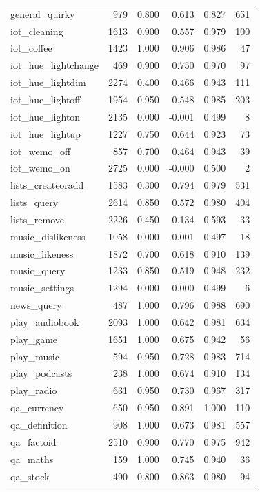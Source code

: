 \begin{longtable}{lrrrrr}
general\_quirky & 979 & 0.800 & 0.613 & 0.827 & 651 \\
iot\_cleaning & 1613 & 0.900 & 0.557 & 0.979 & 100 \\
iot\_coffee & 1423 & 1.000 & 0.906 & 0.986 & 47 \\
iot\_hue\_lightchange & 469 & 0.900 & 0.750 & 0.970 & 97 \\
iot\_hue\_lightdim & 2274 & 0.400 & 0.466 & 0.943 & 111 \\
iot\_hue\_lightoff & 1954 & 0.950 & 0.548 & 0.985 & 203 \\
iot\_hue\_lighton & 2135 & 0.000 & -0.001 & 0.499 & 8 \\
iot\_hue\_lightup & 1227 & 0.750 & 0.644 & 0.923 & 73 \\
iot\_wemo\_off & 857 & 0.700 & 0.464 & 0.943 & 39 \\
iot\_wemo\_on & 2725 & 0.000 & -0.000 & 0.500 & 2 \\
lists\_createoradd & 1583 & 0.300 & 0.794 & 0.979 & 531 \\
lists\_query & 2614 & 0.850 & 0.572 & 0.980 & 404 \\
lists\_remove & 2226 & 0.450 & 0.134 & 0.593 & 33 \\
music\_dislikeness & 1058 & 0.000 & -0.001 & 0.497 & 18 \\
music\_likeness & 1872 & 0.700 & 0.618 & 0.910 & 139 \\
music\_query & 1233 & 0.850 & 0.519 & 0.948 & 232 \\
music\_settings & 1294 & 0.000 & 0.000 & 0.499 & 6 \\
news\_query & 487 & 1.000 & 0.796 & 0.988 & 690 \\
play\_audiobook & 2093 & 1.000 & 0.642 & 0.981 & 634 \\
play\_game & 1651 & 1.000 & 0.675 & 0.942 & 56 \\
play\_music & 594 & 0.950 & 0.728 & 0.983 & 714 \\
play\_podcasts & 238 & 1.000 & 0.674 & 0.910 & 134 \\
play\_radio & 631 & 0.950 & 0.730 & 0.967 & 317 \\
qa\_currency & 650 & 0.950 & 0.891 & 1.000 & 110 \\
qa\_definition & 908 & 1.000 & 0.673 & 0.981 & 557 \\
qa\_factoid & 2510 & 0.900 & 0.770 & 0.975 & 942 \\
qa\_maths & 159 & 1.000 & 0.745 & 0.940 & 36 \\
qa\_stock & 490 & 0.800 & 0.863 & 0.980 & 94 \\

\end{longtable}
